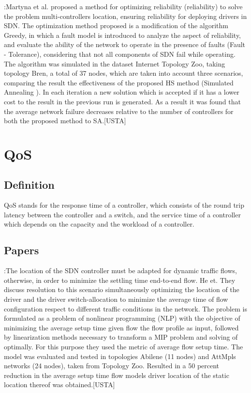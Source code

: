 \documentclass[a4paper,10pt]{article}
\begin{document}
\cite{MaJe18}:Martyna et al. proposed a method for optimizing reliability (reliability) to solve the problem multi-controllers location, ensuring reliability for deploying drivers in SDN. The optimization method proposed is a modification of the algorithm Greedy, in which a fault model is introduced to analyze the aspect of reliability, and evaluate the ability of the network to operate in the presence of faults (Fault - Tolerance), considering that not all components of SDN fail while operating. The algorithm was simulated in the dataset Internet Topology Zoo, taking topology Bren, a total of 37 nodes, which are taken into account three scenarios, comparing the result the effectiveness of the proposed HS method (Simulated Annealing ). In each iteration a new solution which is accepted if it has a lower cost to the result in the previous run is generated. As a result it was found that the average network failure decreases relative to the number of controllers for both the proposed method to SA.[USTA]


\section{QoS}
\subsection{Definition}
QoS stands for the response time of a controller, which consists of the round trip latency between the controller and a switch, and the service time of a controller which depends on the capacity and the workload of a controller.

\subsection{Papers}
\cite{HeBa17}:The location of the SDN controller must be adapted for dynamic traffic flows, otherwise, in order to minimize the settling time end-to-end flow. He et. They discuss resolution to this scenario simultaneously optimizing the location of the driver and the driver switch-allocation to minimize the average time of flow configuration respect to different traffic conditions in the network. The problem is formulated as a problem of nonlinear programming (NLP) with the objective of minimizing the average setup time given flow the flow profile as input, followed by linearization methods necessary to transform a MIP problem and solving of optimally. For this purpose they used the metric of average flow setup time.
The model was evaluated and tested in topologies Abilene (11 nodes) and AttMpls networks (24 nodes), taken from Topology Zoo. Resulted in a 50 percent reduction in the average setup time flow models driver location of the static location thereof was obtained.[USTA]
\end{document}
